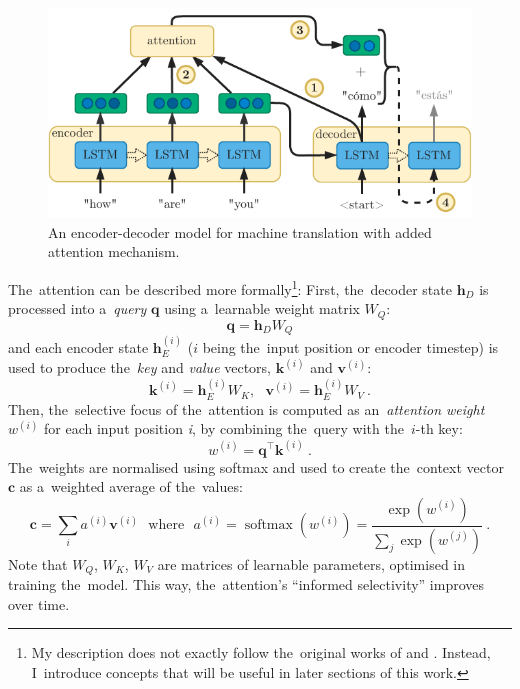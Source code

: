 \documentclass[bsc,frontabs,singlespacing,parskip,deptreport]{infthesis}
\DeclareMathOperator{\softmax}{softmax}
\begin{document}
{{    \begin{figure}[h!t]
      \centering
      \includegraphics[width=11.5cm]{graphics/encoder-decoder-att}
      \cprotect\caption{An encoder-decoder model for machine translation with added attention mechanism.}
      \label{fig:encoder-decoder-att}
    \end{figure}
    
    The~attention can be described more formally\footnote{My description does not exactly follow the~original works of \citet{Bahdanau_2014} and \citet{Luong_2015}. Instead, I~introduce concepts that will be useful in later sections of this work.}: First, the~decoder state $\bm{h}_D$ is processed into a~\textit{query} $\bm{q}$ using a~learnable weight matrix $W_Q$:
    \begin{equation}
    \bm{q}=\bm{h}_DW_Q
    \end{equation}
    and each encoder state $\bm{h}_E^{(i)}$ ($i$ being the~input position or encoder timestep) is used to produce the~\textit{key} and \textit{value} vectors, $\bm{k}^{(i)}$ and $\bm{v}^{(i)}$:
    \begin{equation}
    \bm{k}^{(i)} = \bm{h}_E^{(i)}W_K,\ \ \ \bm{v}^{(i)} = \bm{h}_E^{(i)}W_V\ .
    \end{equation}
    Then, the~selective focus of the~attention is computed as an~\textit{attention weight} $w^{(i)}$ for each input position \textit{i}, by combining the~query with the~$i$-th key:
    \begin{equation}
    w^{(i)}=\bm{q}^\top\bm{k}^{(i)}\ .
    \end{equation}
    The~weights are normalised using softmax and used to create the~context vector $\bm{c}$ as a~weighted average of the~values:
    \begin{equation}
    \bm{c}=\sum_{i}a^{(i)}\bm{v}^{(i)}\ \ \ \textrm{where}\ \ \ a^{(i)}=\softmax(w^{(i)})=\frac{\exp{(w^{(i)})}}{\sum_{j}\exp{(w^{(j)})}}\ .
    \end{equation}
    Note that $W_Q$, $W_K$, $W_V$ are matrices of learnable parameters, optimised in training the~model. This way, the~attention's ``informed selectivity'' improves over time.
    
}}
\end{document}
